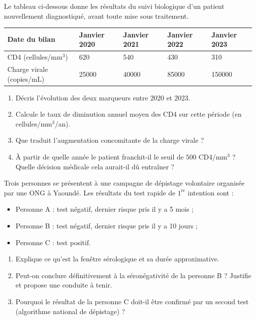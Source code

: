 \documentclass[11pt]{article}
\newcommand{\cle}[1]{{\popxbold\color{popdark}#1}}
\begin{document}
\begin{exercice}
Le tableau ci-dessous donne les résultats du suivi biologique d'un patient nouvellement diagnostiqué, avant toute mise sous traitement.

\begin{center}
\begin{tabularx}{\linewidth}{|l|X|X|X|X|}\hline
\rowcolor{popblueL} Date du bilan & Janvier 2020 & Janvier 2021 & Janvier 2022 & Janvier 2023 \\ \hline
CD4 (cellules/mm$^3$) & 620 & 540 & 430 & 310 \\ \hline
Charge virale (copies/mL) & \num{25000} & \num{40000} & \num{85000} & \num{150000} \\ \hline
\end{tabularx}
\end{center}

\begin{enumerate}
\item Décris l'évolution des deux marqueurs entre 2020 et 2023.
\item Calcule le taux de diminution annuel moyen des CD4 sur cette période (en cellules/mm$^3$/an).
\item Que traduit l'augmentation concomitante de la charge virale ?
\item À partir de quelle année le patient franchit-il le seuil de $500$ CD4/mm$^3$ ? Quelle décision médicale cela aurait-il dû entraîner ?
\end{enumerate}
\end{exercice}

\begin{exercice}
Trois personnes se présentent à une campagne de dépistage volontaire organisée par une ONG à Yaoundé. Les résultats du test rapide de $1^{\text{re}}$ intention sont :
\begin{itemize}
\item Personne A : test négatif, dernier risque pris il y a 5 mois ;
\item Personne B : test négatif, dernier risque pris il y a 10 jours ;
\item Personne C : test positif.
\end{itemize}
\begin{enumerate}
\item Explique ce qu'est la \cle{fenêtre sérologique} et sa durée approximative.
\item Peut-on conclure définitivement à la séronégativité de la personne B ? Justifie et propose une conduite à tenir.
\item Pourquoi le résultat de la personne C doit-il être confirmé par un second test (algorithme national de dépistage) ?
\end{enumerate}
\end{exercice}
\end{document}
